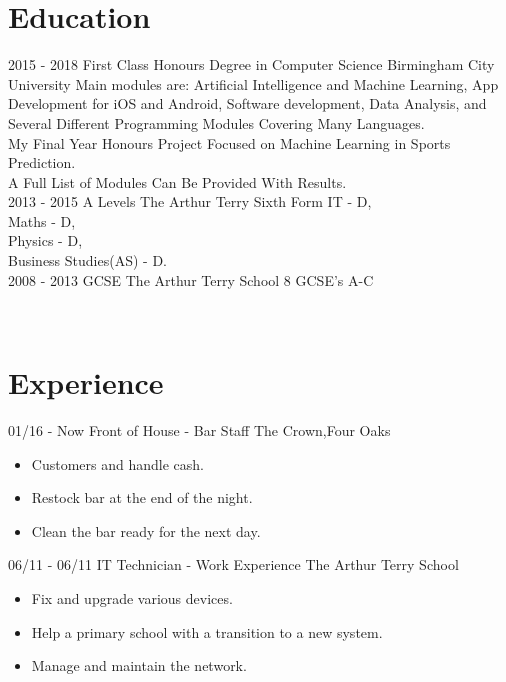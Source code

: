 \documentclass[]{friggeri-cv}
\begin{document}
\section{Education}
\begin{entrylist}
  \entry
    {2015 - 2018}
    {First Class Honours Degree in Computer Science}
    {Birmingham City University}
    {Main modules are: Artificial Intelligence and Machine Learning, App Development for iOS and Android, Software development, Data Analysis, and Several Different Programming Modules Covering Many Languages.\\ My Final Year Honours Project Focused on Machine Learning in Sports Prediction. \\ A Full List of Modules Can Be Provided With Results.\\}
  \entry
    {2013 - 2015}
    {A Levels}
    {The Arthur Terry Sixth Form}
    {IT - D,\\ Maths - D,\\ Physics - D,\\ Business Studies(AS) - D.\\}
  \entry
    {2008 - 2013}
    {GCSE}
    {The Arthur Terry School}
    {8 GCSE's A-C}
\end{entrylist}
\\
\section{Experience}
\begin{entrylist}
  \entry
    {01/16 - Now}
    {Front of House - Bar Staff}
    {The Crown,Four Oaks}
    {\begin{itemize}
    	\item Customers and handle cash.
    	\item Restock bar at the end of the night.
    	\item  Clean the bar ready for the next day.
    \end{itemize}}
  \entry
    {06/11 - 06/11}
    {IT Technician - Work Experience }
    {The Arthur Terry School}
    {\begin{itemize}
    	\item Fix and upgrade various devices.
    	\item Help a primary school with a transition to a new system.
    	\item Manage and maintain the network.
    \end{itemize}}
\end{entrylist}
\newpage
\end{document}
